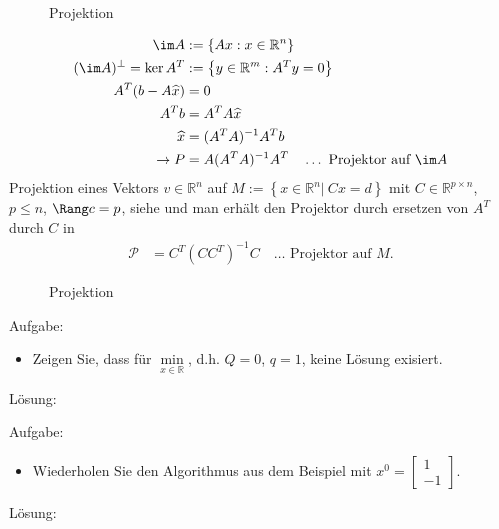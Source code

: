 \begin{enumerate}[label=(\arabic*)]
\begin{figure}[!htb]
			\centering
			
			\caption{Projektion}
			\label{fig:kap_1_projektion}
		\end{figure}
  		\begin{align}
  			\im A & := \left\{Ax:x\in\mathbb{R}^n \right\} \notag\\
  			(\im A)^{\bot} =\ker A^T & := \left\{y\in\mathbb{R}^m:A^Ty=0 \right\}\notag\\
  			A^T(b-A\widehat{x}) & = 0\notag\\
  			A^Tb & = A^TA\widehat{x}\notag\\
  			\widehat{x} & = (A^TA)^{-1}A^Tb\notag\\ 
  			\rightarrow P & = A(A^TA)^{-1}A^T\quad \ldots\text{ Projektor auf $\im A$} \label{eq:kap_1_projektion}
  		\end{align}
  		Projektion eines Vektors $v\in\mathbb{R}^n$ auf $M:=\left\{x\in\mathbb{R}^n|\ Cx=d \right\}$ mit $C\in\mathbb{R}^{p\times n}$, $p\le n$, $\Rang c = p$, siehe
  		 und man erhält den Projektor durch ersetzen von $A^T$ durch $C$ in 
  		\begin{align*}
  			\mathcal{P} & = C^T(CC^T)^{-1}C\quad \ldots\text{ Projektor auf $M$}. 
  		\end{align*}
  		\begin{figure}[!htb]
			\centering
			
			\caption{Projektion}
			\label{fig:kap_1_projektion}
		\end{figure}
\end{enumerate}
\begin{uea}
Aufgabe:
\begin{itemize}
  \item[] Zeigen Sie, dass für $\min\limits_{x\in\mathbb{R}}$, d.h. $Q=0$, $q=1$, keine Lösung exisiert. 
\end{itemize}
Lösung:
\end{uea}
\begin{uea}
Aufgabe:
\begin{itemize}
  \item[] Wiederholen Sie den Algorithmus aus dem Beispiel mit $x^0=\begin{bmatrix}1\\ -1 \end{bmatrix}$. 
\end{itemize}
Lösung:
\end{uea}


